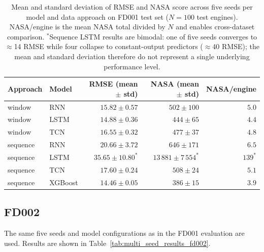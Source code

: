 \documentclass[a4paper,11pt]{article}
\begin{document}
\begin{table}[h]
    \centering
    \begin{tabular}{llrrr}
        \hline
        \textbf{Approach} & \textbf{Model} & \textbf{RMSE (mean $\pm$ std)} & \textbf{NASA (mean $\pm$ std)} & \textbf{NASA/engine} \\
        \hline
        window   & RNN     & $15.82 \pm 0.57$ & $502 \pm 100$ & $5.0$ \\
        window   & LSTM    & $14.88 \pm 0.36$ & $444 \pm 65$  & $4.4$ \\
        window   & TCN     & $16.55 \pm 0.32$ & $477 \pm 37$  & $4.8$ \\
        sequence & RNN     & $20.66 \pm 3.72$ & $646 \pm 171$ & $6.5$ \\
        sequence & LSTM    & $35.65 \pm 10.80^{*}$ & $13\,881 \pm 7\,554^{*}$ & $139^{*}$ \\
        sequence & TCN     & $17.60 \pm 0.24$ & $508 \pm 24$  & $5.1$ \\
        sequence & XGBoost & $14.46 \pm 0.05$ & $386 \pm 15$  & $3.9$ \\
        \hline
    \end{tabular}
    \caption{Mean and standard deviation of RMSE and NASA score across five seeds per model and data approach on FD001 test set ($N=100$ test engines). NASA/engine is the mean NASA total divided by $N$ and enables cross-dataset comparison. $^{*}$Sequence LSTM results are bimodal: one of five seeds converges to $\approx$14 RMSE while four collapse to constant-output predictors ($\approx$40 RMSE); the mean and standard deviation therefore do not represent a single underlying performance level.}
    \label{tab:multi_seed_results}
\end{table}

\subsection{FD002}

The same five seeds and model configurations as in the FD001 evaluation are used.
Results are shown in Table~\ref{tab:multi_seed_results_fd002}.
\end{document}
